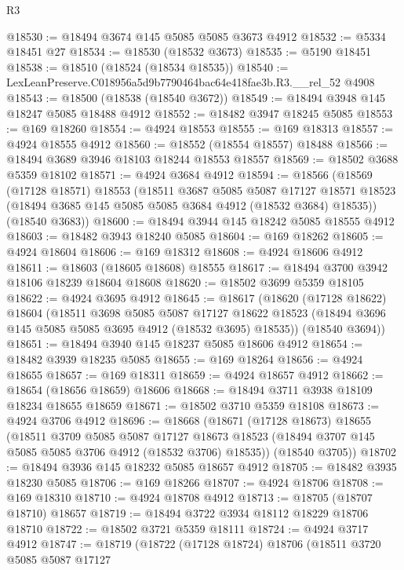 \begin{lexlean}{R3}
\begin{coremodule}
@18530 := @18494 @3674 @145 @5085 @5085 @3673 @4912
@18532 := @5334 @18451 @27
@18534 := @18530 (@18532 @3673)
@18535 := @5190 @18451
@18538 := @18510 (@18524 (@18534 @18535))
@18540 := LexLeanPreserve.C018956a5d9b7790464bac64e418fae3b.R3.__rel_52 @4908
@18543 := @18500 (@18538 (@18540 @3672))
@18549 := @18494 @3948 @145 @18247 @5085 @18488 @4912
@18552 := @18482 @3947 @18245 @5085
@18553 := @169 @18260
@18554 := @4924 @18553
@18555 := @169 @18313
@18557 := @4924 @18555 @4912
@18560 := @18552 (@18554 @18557) @18488
@18566 := @18494 @3689 @3946 @18103 @18244 @18553 @18557
@18569 := @18502 @3688 @5359 @18102
@18571 := @4924 @3684 @4912
@18594 := @18566
    (@18569
      (@17128 @18571)
      @18553
      (@18511
        @3687
        @5085
        @5087
        @17127
        @18571
        @18523
        (@18494 @3685 @145 @5085 @5085 @3684 @4912 (@18532 @3684) @18535))
      (@18540 @3683))
@18600 := @18494 @3944 @145 @18242 @5085 @18555 @4912
@18603 := @18482 @3943 @18240 @5085
@18604 := @169 @18262
@18605 := @4924 @18604
@18606 := @169 @18312
@18608 := @4924 @18606 @4912
@18611 := @18603 (@18605 @18608) @18555
@18617 := @18494 @3700 @3942 @18106 @18239 @18604 @18608
@18620 := @18502 @3699 @5359 @18105
@18622 := @4924 @3695 @4912
@18645 := @18617
    (@18620
      (@17128 @18622)
      @18604
      (@18511
        @3698
        @5085
        @5087
        @17127
        @18622
        @18523
        (@18494 @3696 @145 @5085 @5085 @3695 @4912 (@18532 @3695) @18535))
      (@18540 @3694))
@18651 := @18494 @3940 @145 @18237 @5085 @18606 @4912
@18654 := @18482 @3939 @18235 @5085
@18655 := @169 @18264
@18656 := @4924 @18655
@18657 := @169 @18311
@18659 := @4924 @18657 @4912
@18662 := @18654 (@18656 @18659) @18606
@18668 := @18494 @3711 @3938 @18109 @18234 @18655 @18659
@18671 := @18502 @3710 @5359 @18108
@18673 := @4924 @3706 @4912
@18696 := @18668
    (@18671
      (@17128 @18673)
      @18655
      (@18511
        @3709
        @5085
        @5087
        @17127
        @18673
        @18523
        (@18494 @3707 @145 @5085 @5085 @3706 @4912 (@18532 @3706) @18535))
      (@18540 @3705))
@18702 := @18494 @3936 @145 @18232 @5085 @18657 @4912
@18705 := @18482 @3935 @18230 @5085
@18706 := @169 @18266
@18707 := @4924 @18706
@18708 := @169 @18310
@18710 := @4924 @18708 @4912
@18713 := @18705 (@18707 @18710) @18657
@18719 := @18494 @3722 @3934 @18112 @18229 @18706 @18710
@18722 := @18502 @3721 @5359 @18111
@18724 := @4924 @3717 @4912
@18747 := @18719
    (@18722
      (@17128 @18724)
      @18706
      (@18511
        @3720
        @5085
        @5087
        @17127

\end{coremodule}
\end{lexlean}
